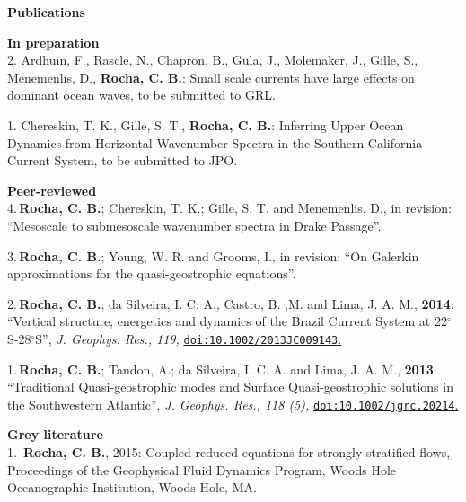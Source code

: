 \documentclass[a4paper,11pt,final]{memoir}
\newcommand{\Sep}{\vspace{1.5em}}
\newcommand{\SmallSep}{\vspace{0.5em}}
\newcommand{\CVSection}[1]
    {\Large\textbf{#1}\par
    \SmallSep\normalsize\normalfont}
\newcommand{\CVItem}[1]
    {\textbf{\color{NavyBlue} #1}}
\begin{document}
\Sep

\Sep

\CVSection{Publications}

\CVItem{In preparation}\\

2. Ardhuin, F., Rascle, N., Chapron, B., Gula, J., Molemaker, J., Gille, S., Menemenlis, D., \textbf{Rocha, C. B.}: Small scale currents have large effects on dominant ocean waves, to be submitted to GRL.

\SmallSep

1. Chereskin, T. K., Gille, S. T., \textbf{Rocha, C. B.}: Inferring Upper Ocean Dynamics from Horizontal Wavenumber Spectra in the Southern California Current System, to be submitted to JPO. 

\Sep

\CVItem{Peer-reviewed}\\

4.\,\textbf{Rocha, C. B.};  Chereskin, T. K.; Gille, S. T. and Menemenlis, D., {in revision}: ``Mesoscale to submesoscale wavenumber spectra in Drake Passage''. 

\SmallSep

3.\,\textbf{Rocha, C. B.};  Young, W. R. and Grooms, I., {in revision}: ``On Galerkin approximations for the quasi-geostrophic equations''. 

\SmallSep

2.\,\textbf{Rocha, C. B.};  da Silveira, I. C. A., Castro, B. ,M. and Lima, J. A. M., \textbf{2014}: ``Vertical structure, energetics and dynamics of the Brazil Current System at 22$^\circ$S-28$^\circ$S'', \textit{ J. Geophys. Res., 119,} \href{http://onlinelibrary.wiley.com/doi/10.1002/2013JC009143/abstract}{\texttt{doi:10.1002/2013JC009143}.} 

\SmallSep

1.\,\textbf{Rocha, C. B.}; Tandon, A.; da Silveira, I. C. A. and Lima, J. A. M., \textbf{2013}: ``Traditional Quasi-geostrophic modes and Surface Quasi-geostrophic solutions in the Southwestern Atlantic'', \textit{ J. Geophys. Res., 118 (5),} \href{http://dx.doi.org/10.1002/jgrc.20214}{\texttt{doi:10.1002/jgrc.20214}.} 

\Sep

\CVItem{Grey literature}\\

1.\, \textbf{Rocha, C. B.}, 2015: Coupled reduced equations for strongly stratified flows,  Proceedings of the Geophysical Fluid Dynamics Program,  Woods Hole Oceanographic Institution, Woods Hole, MA.
\end{document}
